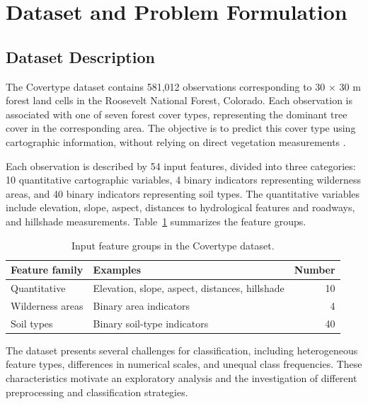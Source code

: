 \documentclass[10pt,a4paper]{article}
\begin{document}

\section{Dataset and Problem Formulation}

\subsection{Dataset Description}

The Covertype dataset contains 581,012 observations corresponding to
30 $\times$ 30 m forest land cells in the Roosevelt National Forest,
Colorado. Each observation is associated with one of seven forest cover
types, representing the dominant tree cover in the corresponding area.
The objective is to predict this cover type using cartographic
information, without relying on direct vegetation measurements
\cite{uci}.

Each observation is described by 54 input features, divided into three
categories: 10 quantitative cartographic variables, 4 binary indicators
representing wilderness areas, and 40 binary indicators representing
soil types. The quantitative variables include elevation, slope,
aspect, distances to hydrological features and roadways, and hillshade
measurements. Table~\ref{tab:features} summarizes the feature groups.

\begin{table}[htbp]
\centering
\small
\begin{tabularx}{0.95\linewidth}{@{}lXr@{}}
\toprule
Feature family & Examples & Number\\
\midrule
Quantitative & Elevation, slope, aspect, distances, hillshade & 10\\
Wilderness areas & Binary area indicators & 4\\
Soil types & Binary soil-type indicators & 40\\
\bottomrule
\end{tabularx}
\caption{Input feature groups in the Covertype dataset.}
\label{tab:features}
\end{table}

The dataset presents several challenges for classification, including
heterogeneous feature types, differences in numerical scales, and
unequal class frequencies. These characteristics motivate an
exploratory analysis and the investigation of different preprocessing
and classification strategies.
\end{document}
